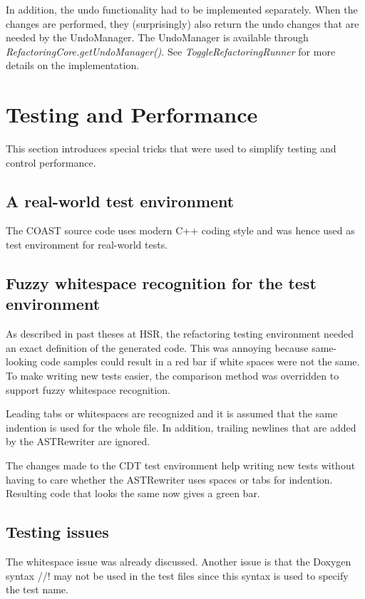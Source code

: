 In addition, the undo functionality had to be implemented separately. When the 
changes are performed, they (surprisingly) also return the undo changes that are 
needed by the UndoManager. The UndoManager is available through 
\textit{RefactoringCore.getUndoManager()}. See \textit{ToggleRefactoringRunner} 
for more details on the implementation.

\section{Testing and Performance}

This section introduces special tricks that were used to simplify testing and
control performance.

\subsection{A real-world test environment}
The COAST source code uses modern C++ coding style and was hence used as test 
environment for real-world tests.

\subsection{Fuzzy whitespace recognition for the test environment}

As described in past theses at HSR, the refactoring testing environment
needed an exact definition of the generated code. This was annoying because
same-looking code samples could result in a red bar if white spaces were not the
same. To make writing new tests easier, the comparison method was overridden to
support fuzzy whitespace recognition.

Leading tabs or whitespaces are recognized and it is assumed that the same
indention is used for the whole file. In addition, trailing newlines that are
added by the ASTRewriter are ignored.

The changes made to the CDT test environment help writing new tests without
having to care whether the ASTRewriter uses spaces or tabs for indention.
Resulting code that looks the same now gives a green bar.

\subsection{Testing issues}

The whitespace issue was already discussed. Another issue is that the Doxygen 
syntax //! may not be used in the test files since this syntax is used to 
specify the test name.

